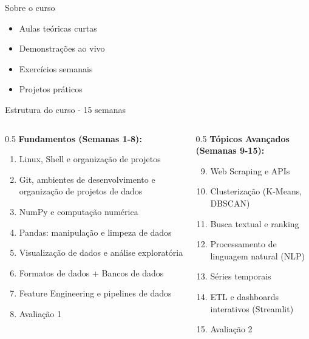 \documentclass[xcolor=dvipsnames,t,aspectratio=169]{beamer}
\begin{document}
\begin{frame}[c]{Sobre o curso}

\begin{display}[Metodologia]
\begin{itemize}
\item Aulas teóricas curtas
\item Demonstrações ao vivo
\item Exercícios semanais
\item Projetos práticos
\end{itemize}
\end{display}

\end{frame}

\begin{frame}[c]{Estrutura do curso - 15 semanas}
    \begin{columns}[c]
        \begin{column}{0.5\textwidth}
            \textbf{Fundamentos (Semanas 1-8):}
            \begin{enumerate}
                \item Linux, Shell e organização de projetos
                \item Git, ambientes de desenvolvimento e organização de projetos de dados
                \item NumPy e computação numérica
                \item Pandas: manipulação e limpeza de dados
                \item Visualização de dados e análise exploratória
                \item Formatos de dados + Bancos de dados
                \item Feature Engineering e pipelines de dados
                \item Avaliação 1
            \end{enumerate}
        \end{column}
        \begin{column}{0.5\textwidth}
            \textbf{Tópicos Avançados (Semanas 9-15):}
            \begin{enumerate}
                \setcounter{enumi}{8}
                \item Web Scraping e APIs
                \item Clusterização (K-Means, DBSCAN)
                \item Busca textual e ranking
                \item Processamento de linguagem natural (NLP)
                \item Séries temporais
                \item ETL e dashboards interativos (Streamlit)
                \item Avaliação 2
            \end{enumerate}
        \end{column}
    \end{columns}
\end{frame}
\end{document}
